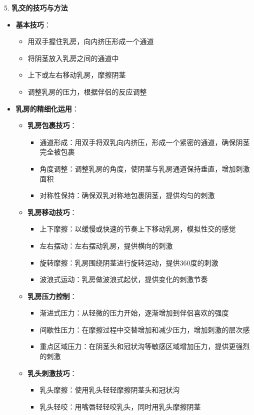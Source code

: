 \documentclass[12pt,UTF8]{ctexbook}
\begin{document}
5. \textbf{乳交的技巧与方法}
\begin{itemize}
	\item \textbf{基本技巧}：
	\begin{itemize}
		\item 用双手握住乳房，向内挤压形成一个通道
		\item 将阴茎放入乳房之间的通道中
		\item 上下或左右移动乳房，摩擦阴茎
		\item 调整乳房的压力，根据伴侣的反应调整
	\end{itemize}
	\item \textbf{乳房的精细化运用}：
	\begin{itemize}
		\item \textbf{乳房包裹技巧}：
		\begin{itemize}
			\item 通道形成：用双手将双乳向内挤压，形成一个紧密的通道，确保阴茎完全被包裹
			\item 角度调整：调整乳房的角度，使阴茎与乳房通道保持垂直，增加刺激面积
			\item 对称性保持：确保双乳对称地包裹阴茎，提供均匀的刺激
		\end{itemize}
		\item \textbf{乳房移动技巧}：
		\begin{itemize}
			\item 上下摩擦：以缓慢或快速的节奏上下移动乳房，模拟性交的感觉
			\item 左右摆动：左右摆动乳房，提供横向的刺激
			\item 旋转摩擦：乳房围绕阴茎进行旋转运动，提供360度的刺激
			\item 波浪式运动：乳房做波浪式起伏，提供变化的刺激节奏
		\end{itemize}
		\item \textbf{乳房压力控制}：
		\begin{itemize}
			\item 渐进式压力：从轻微的压力开始，逐渐增加到伴侣喜欢的强度
			\item 间歇性压力：在摩擦过程中交替增加和减少压力，增加刺激的层次感
			\item 重点区域压力：在阴茎头和冠状沟等敏感区域增加压力，提供更强烈的刺激
		\end{itemize}
		\item \textbf{乳头刺激技巧}：
		\begin{itemize}
			\item 乳头摩擦：使用乳头轻轻摩擦阴茎头和冠状沟
			\item 乳头轻咬：用嘴唇轻轻咬乳头，同时用乳头摩擦阴茎

\end{itemize}
\end{itemize}
\end{itemize}
\end{document}
